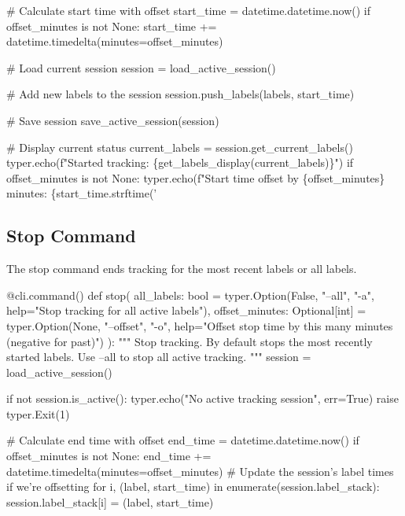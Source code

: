     # Calculate start time with offset
    start_time = datetime.datetime.now()
    if offset_minutes is not None:
        start_time += datetime.timedelta(minutes=offset_minutes)
    
    # Load current session
    session = load_active_session()
    
    # Add new labels to the session
    session.push_labels(labels, start_time)
    
    # Save session
    save_active_session(session)
    
    # Display current status
    current_labels = session.get_current_labels()
    typer.echo(f"Started tracking: \{get_labels_display(current_labels)\}")
    if offset_minutes is not None:
        typer.echo(f"Start time offset by \{offset_minutes\} minutes: \{start_time.strftime('%
\nwendcode{}\nwdocspar

\subsection{Stop Command}

The stop command ends tracking for the most recent labels or all labels.

\nwenddocs{}\endmoddef\nwstartdeflinemarkup{}\nwenddeflinemarkup
@cli.command()
def stop(
    all_labels: bool = typer.Option(False, "--all", "-a", 
                                  help="Stop tracking for all active labels"),
    offset_minutes: Optional[int] = typer.Option(None, "--offset", "-o",
                                               help="Offset stop time by this many minutes (negative for past)")
):
    """
    Stop tracking. By default stops the most recently started labels.
    Use --all to stop all active tracking.
    """
    session = load_active_session()
    
    if not session.is_active():
        typer.echo("No active tracking session", err=True)
        raise typer.Exit(1)
    
    # Calculate end time with offset  
    end_time = datetime.datetime.now()
    if offset_minutes is not None:
        end_time += datetime.timedelta(minutes=offset_minutes)
        # Update the session's label times if we're offsetting
        for i, (label, start_time) in enumerate(session.label_stack):
            session.label_stack[i] = (label, start_time)
    
